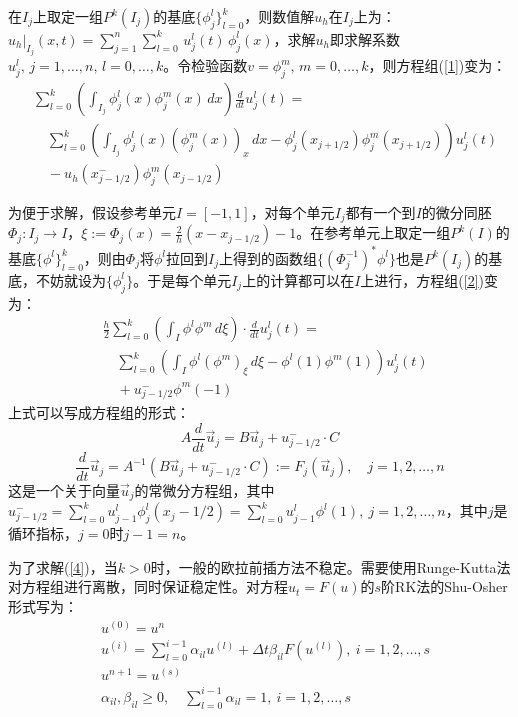 \documentclass[12pt, a4paper]{ctexart}
\begin{document}
	在$I_j$上取定一组$P^k(I_j)$的基底$\{ \phi_j^l \}_{l=0}^k$，则数值解$u_h$在$I_j$上为：$u_h|_{I_j}(x,t) = \sum_{j=1}^n \sum_{l=0}^k \, u_j^l(t) \, \phi_j^l(x)$，求解$u_h$即求解系数$u_j^l, \, j=1, \dots, n, \, l=0, \dots, k$。令检验函数$v = \phi_j^m, \, m=0, \dots, k$，则方程组(\ref{1})变为：
	\begin{equation}
	\begin{split}
	& \sum_{l=0}^k (\int_{I_j} \phi_j^l(x) \phi_j^m(x) \, dx ) \frac{d}{dt} u_j^l(t) = \\
	&\quad  \sum_{l=0}^k (\int_{I_j} \phi_j^l(x) (\phi_j^m(x))_x \, dx - \phi_j^l(x_{j+1/2}) \phi_j^m(x_{j+1/2}) ) u_j^l(t)\\
	& \quad  - u_h(x_{j-1/2}^-) \phi_j^m(x_{j-1/2}) 
	\end{split}
	\label{2}
	\end{equation}
	
	为便于求解，假设参考单元$I = [-1,1]$，对每个单元$I_j$都有一个到$I$的微分同胚$\Phi_j : I_j \to I$，$ \xi := \Phi_j(x) = \frac{2}{h} (x - x_{j-1/2}) - 1$。在参考单元上取定一组$P^k(I)$的基底$\{\phi^l\}_{l=0}^k$，则由$\Phi_j$将$\phi^l$拉回到$I_j$上得到的函数组$\{(\Phi_j^{-1})^* \phi^l\}$也是$P^k(I_j)$的基底，不妨就设为$\{\phi_j^l\}$。于是每个单元$I_j$上的计算都可以在$I$上进行，方程组(\ref{2})变为：
	\begin{equation}
	\begin{split}
	& \frac{h}{2} \sum_{l=0}^k (\int_{I} \phi^l \phi^m \, d\xi) \cdot \frac{d}{dt} u_j^l(t) = \\
	& \quad \sum_{l=0}^k (\int_{I} \phi^l (\phi^m)_{\xi} \, d\xi - \phi^l(1) \phi^m(1)) u_j^l(t)\\
	& \quad + u_{j-1/2}^- \phi^m(-1)
	\end{split}
	\label{3}
	\end{equation}
	上式可以写成方程组的形式：
	$$
	A \frac{d}{dt} \vec{u}_j = B \vec{u}_j + u_{j-1/2}^- \cdot C
	$$
	\begin{equation}
	\frac{d}{dt} \vec{u}_j =A^{-1} (B \vec{u}_j + u_{j-1/2}^- \cdot C) := F_j(\vec{u}_j), \quad j = 1,2, \dots,n
	\label{4}
	\end{equation}
	这是一个关于向量$\vec{u}_j$的常微分方程组，其中$u_{j-1/2}^- = \sum_{l=0}^k u_{j-1}^l \phi_j^l(x_j-1/2) =  \sum_{l=0}^k u_{j-1}^l \phi^l(1) $$, \  j= 1,2, \dots,n$，其中$j$是循环指标，$j=0$时$j-1 = n$。
	
	为了求解(\ref{4})，当$k>0$时，一般的欧拉前插方法不稳定。需要使用Runge-Kutta法对方程组进行离散，同时保证稳定性。对方程$u_t = F(u)$的$s$阶RK法的Shu-Osher形式写为：
	\begin{equation}
	\begin{split}
	& u^{(0)} = u^n \\
	& u^{(i)} = \sum_{l=0}^{i-1} \alpha_{il} u^{(l)} + \Delta t \beta_{il} F(u^{(l)}), \  i = 1,2,\dots,s\\
	& u^{n+1} = u^{(s)}\\
	& \alpha_{il} , \beta_{il} \ge 0, \quad \sum_{l=0}^{i-1} \alpha_{il} = 1, \  i = 1,2,\dots,s
	\end{split}
	\end{equation}
	
\end{document}
